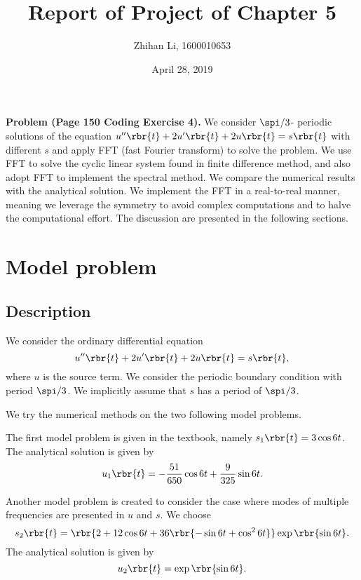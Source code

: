 \documentclass[english, nochinese]{pnote}
\title{Report of Project of Chapter 5}
\author{Zhihan Li, 1600010653}
\date{April 28, 2019}
\begin{document}
\maketitle

\textbf{Problem (Page 150 Coding Exercise 4).} We consider $ \spi / 3 $- periodic solutions of the equation $ u'' \rbr{t} + 2 u' \rbr{t} + 2 u \rbr{t} = s \rbr{t} $ with different $s$ and apply FFT (fast Fourier transform) to solve the problem. We use FFT to solve the cyclic linear system found in finite difference method, and also adopt FFT to implement the spectral method. We compare the numerical results with the analytical solution. We implement the FFT in a real-to-real manner, meaning we leverage the symmetry to avoid complex computations and to halve the computational effort. The discussion are presented in the following sections.

\section{Model problem}

\subsection{Description}

We consider the ordinary differential equation
\begin{equation} \label{Eq:Pero}
u'' \rbr{t} + 2 u' \rbr{t} + 2 u \rbr{t} = s \rbr{t},
\end{equation}
where $u$ is the source term. We consider the periodic boundary condition with period $ \spi / 3 $. We implicitly assume that $s$ has a period of $ \spi / 3 $.

We try the numerical methods on the two following model problems.

The first model problem is given in the textbook, namely $ s_1 \rbr{t} = 3 \cos 6 t $. The analytical solution is given by
\begin{equation}
u_1 \rbr{t} = -\frac{51}{650} \cos 6 t + \frac{9}{325} \sin 6 t.
\end{equation}

Another model problem is created to consider the case where modes of multiple frequencies are presented in $u$ and $s$. We choose
\begin{equation}
s_2 \rbr{t} = \rbr{ 2 + 12 \cos 6 t + 36 \rbr{ -\sin 6 t + \cos^2 6 t } } \exp \rbr{ \sin 6 t }.
\end{equation}
The analytical solution is given by
\begin{equation}
u_2 \rbr{t} = \exp \rbr{ \sin 6 t }.
\end{equation}
\end{document}
